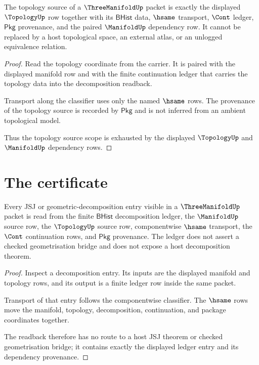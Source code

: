 \begin{theorem}
\label{thm:threemanifold-topology-source-scope}
The topology source of a $\ThreeManifoldUp$ packet is exactly the displayed $\TopologyUp$ row together with its $\mathsf{BHist}$ data, $\hsame$ transport, $\Cont$ ledger, $\mathsf{Pkg}$ provenance, and the paired $\ManifoldUp$ dependency row. It cannot be replaced by a host topological space, an external atlas, or an unlogged equivalence relation.
\end{theorem}
\begin{proof}
Read the topology coordinate from the carrier. It is paired with the displayed manifold row and with the finite continuation ledger that carries the topology data into the decomposition readback.

Transport along the classifier uses only the named $\hsame$ rows. The provenance of the topology source is recorded by $\mathsf{Pkg}$ and is not inferred from an ambient topological model.

Thus the topology source scope is exhausted by the displayed $\TopologyUp$ and $\ManifoldUp$ dependency rows.
\end{proof}

\section{The certificate}
\label{sec:threemanifold-certificate}

\begin{theorem}
\label{thm:threemanifold-jsj-ledger-exactness}
Every JSJ or geometric-decomposition entry visible in a $\ThreeManifoldUp$ packet is read from the finite $\mathsf{BHist}$ decomposition ledger, the $\ManifoldUp$ source row, the $\TopologyUp$ source row, componentwise $\hsame$ transport, the $\Cont$ continuation rows, and $\mathsf{Pkg}$ provenance. The ledger does not assert a checked geometrisation bridge and does not expose a host decomposition theorem.
\end{theorem}
\begin{proof}
Inspect a decomposition entry. Its inputs are the displayed manifold and topology rows, and its output is a finite ledger row inside the same packet.

Transport of that entry follows the componentwise classifier. The $\hsame$ rows move the manifold, topology, decomposition, continuation, and package coordinates together.

The readback therefore has no route to a host JSJ theorem or checked geometrisation bridge; it contains exactly the displayed ledger entry and its dependency provenance.
\end{proof}

